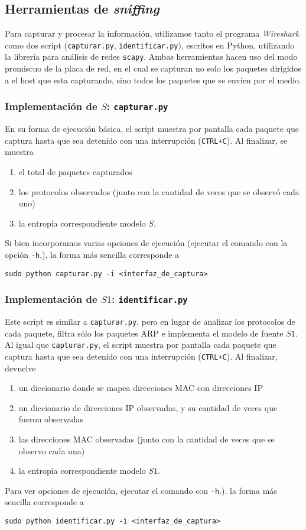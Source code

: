 \subsection{Herramientas de \emph{sniffing}}

Para capturar y procesar la información, utilizamos tanto el programa \textit{Wireshark} como dos script (\texttt{capturar.py}, \texttt{identificar.py}), escritos en Python, utilizando la librería para análisis de redes \texttt{scapy}. Ambas herramientas hacen uso del modo promiscuo de la placa de red, en el cual se capturan no solo los paquetes dirigidos a el host que esta capturando, sino todos los paquetes que se envíen por el medio.

\subsubsection{Implementación de $S$: \texttt{capturar.py}}
En su forma de ejecución básica, el script muestra por pantalla cada paquete que captura hasta que sea detenido con una interrupción (\texttt{CTRL+C}). Al finalizar, se muestra 
\begin{enumerate}
	\item el total de paquetes capturados
	\item los protocolos observados (junto con la cantidad de veces que se observó cada uno)
	\item la entropía correspondiente modelo $S$. 
\end{enumerate}
Si bien incorporamos varias opciones de ejecución (ejecutar el comando con la opción \texttt{-h}.), la forma más sencilla corresponde a 
\begin{verbatim}
sudo python capturar.py -i <interfaz_de_captura>
\end{verbatim}

\subsubsection{Implementación de $S1$: \texttt{identificar.py}}
Este script es similar a \texttt{capturar.py}, pero en lugar de analizar los protocolos de cada paquete, filtra sólo los paquetes ARP e implementa el modelo de fuente $S1$. Al igual que \texttt{capturar.py}, el script muestra por pantalla cada paquete que captura hasta que sea detenido con una interrupción (\texttt{CTRL+C}). Al finalizar, devuelve
\begin{enumerate}
	\item un diccionario donde se mapea direcciones MAC con direcciones IP
	\item un diccionario de direcciones IP observadas, y su cantidad de veces que fueron observadas
	\item las direcciones MAC observadas (junto con la cantidad de veces que se observo cada una)
	\item la entropía correspondiente modelo $S1$. 
\end{enumerate}
Para ver opciones de ejecución, ejecutar el comando con \texttt{-h}.). la forma más sencilla corresponde a 
\begin{verbatim}
sudo python identificar.py -i <interfaz_de_captura>
\end{verbatim}


